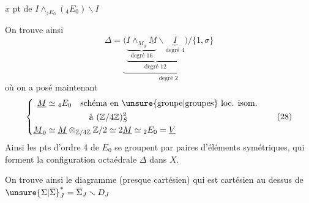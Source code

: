 $x$ pt de $I\mathbin{\wedge}_{{}_2E_0}({}_4E_0)\smallsetminus I$

On trouve ainsi
\[
\Delta=\underbrace{\bigl(\underbrace{\underbrace{I\mathbin{\wedge}_{\underline M_0}\underline M}_{\text{degré }16}
\smallsetminus\underbrace{I}_{\text{degré }4}}_{\text{degré }12}\bigr)/\{1,\sigma\}}_{\text{degré }2}
\tag*{(27)}
\]
où on a posé maintenant
\[
\left\{\begin{aligned}
\underline M&\simeq {}_4E_0\quad\text{schéma en \unsure{groupe|groupes} loc. isom.}\\
&\hspace{5em}\text{à }(\mathbb Z/4\mathbb Z)^2_S\\
\underline M_0&\simeq\underline M\otimes_{\mathbb Z/4\mathbb Z}\mathbb Z/2
\simeq2\underline M\simeq{}_2E_0=\underline V
\end{aligned}\right.
\tag*{(28)}
\]
Ainsi  les pts d'ordre 4 de $E_0$ se groupent par  paires d'éléments symétriques, qui forment la configuration octaédrale $\Delta$ dans $X$.

On trouve ainsi le diagramme (presque cartésien)
qui est cartésien au dessus de $\unsure{\Sigma|\overline\Sigma}_J^*=\overline\Sigma_J\smallsetminus D_J$
